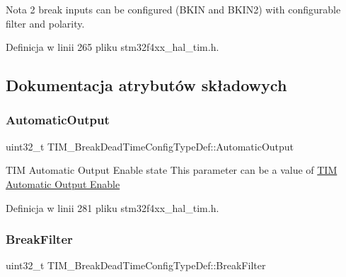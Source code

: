 \begin{DoxyNote}{Nota}
2 break inputs can be configured (B\+K\+IN and B\+K\+I\+N2) with configurable filter and polarity. 
\end{DoxyNote}


Definicja w linii 265 pliku stm32f4xx\+\_\+hal\+\_\+tim.\+h.



\subsection{Dokumentacja atrybutów składowych}
\mbox{\label{struct_t_i_m___break_dead_time_config_type_def_ae591f2368d0be5b77d8a746e73eabe71}} 
\subsubsection{\texorpdfstring{Automatic\+Output}{AutomaticOutput}}
{\footnotesize\ttfamily uint32\+\_\+t T\+I\+M\+\_\+\+Break\+Dead\+Time\+Config\+Type\+Def\+::\+Automatic\+Output}

T\+IM Automatic Output Enable state This parameter can be a value of \hyperlink{group___t_i_m___a_o_e___bit___set___reset}{T\+IM Automatic Output Enable} 

Definicja w linii 281 pliku stm32f4xx\+\_\+hal\+\_\+tim.\+h.

\mbox{\label{struct_t_i_m___break_dead_time_config_type_def_aad8158e694a62f6c071975ee4c2e5b6a}} 
\subsubsection{\texorpdfstring{Break\+Filter}{BreakFilter}}
{\footnotesize\ttfamily uint32\+\_\+t T\+I\+M\+\_\+\+Break\+Dead\+Time\+Config\+Type\+Def\+::\+Break\+Filter}

